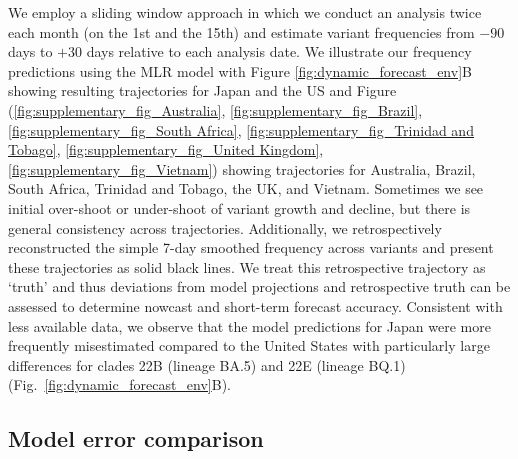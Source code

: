 \documentclass[11pt,oneside,letterpaper]{article}
\begin{document}
We employ a sliding window approach in which we conduct an analysis twice each month (on the 1st and the 15th) and estimate variant frequencies from $-90$ days to $+30$ days relative to each analysis date.
We illustrate our frequency predictions using the MLR model with Figure \ref{fig:dynamic_forecast_env}B showing resulting trajectories for Japan and the US and Figure (\ref{fig:supplementary_fig_Australia}, \ref{fig:supplementary_fig_Brazil}, \ref{fig:supplementary_fig_South Africa}, \ref{fig:supplementary_fig_Trinidad and Tobago}, \ref{fig:supplementary_fig_United Kingdom}, \ref{fig:supplementary_fig_Vietnam}) showing trajectories for Australia, Brazil, South Africa, Trinidad and Tobago, the UK, and Vietnam.
Sometimes we see initial over-shoot or under-shoot of variant growth and decline, but there is general consistency across trajectories.
Additionally, we retrospectively reconstructed the simple 7-day smoothed frequency across variants and present these trajectories as solid black lines.
We treat this retrospective trajectory as `truth' and thus deviations from model projections and retrospective truth can be assessed to determine nowcast and short-term forecast accuracy.
Consistent with less available data, we observe that the model predictions for Japan were more frequently misestimated compared to the United States with particularly large differences for clades 22B (lineage BA.5) and 22E (lineage BQ.1) (Fig.~\ref{fig:dynamic_forecast_env}B).

\subsection*{Model error comparison}
\end{document}
